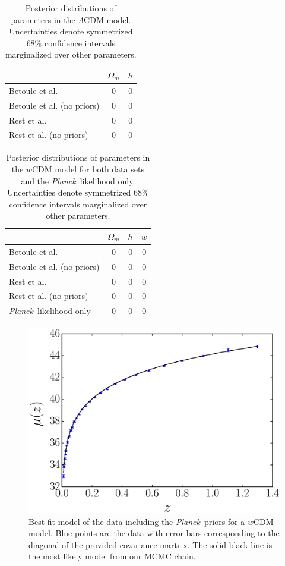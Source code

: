 \documentclass[12pt,a4paper]{article}
\newcommand\Planck{{\it Planck}\ }
\begin{document}
\begin{table}[h]
   \centering
    \begin{tabular}{l|cc}
    ~                          & $\Omega_m$ & $h$ \\ \hline
    Betoule et al.             & 0      & 0 \\
    Betoule et al. (no priors) & 0      & 0 \\
    Rest et al.                & 0      & 0 \\
    Rest et al. (no priors)    & 0      & 0 \\
    \end{tabular}
    \caption {\label{tab:lcdm}Posterior distributions of parameters in the
      $\Lambda$CDM model. Uncertainties denote symmetrized 68\%
      confidence intervals marginalized over other parameters.}
\end{table}
%
\begin{table}[h]
  \label{tab:wcdm}
  \centering
  \begin{tabular}{l|ccc}
    ~                          & $\Omega_m$ & $h$ & $w$ \\ \hline
    Betoule et al.             & 0                      & 0     & 0     \\
    Betoule et al. (no priors) & 0                      & 0     & 0     \\
    Rest et al.                & 0                      & 0     & 0     \\
    Rest et al. (no priors)    & 0                      & 0     & 0     \\
    \Planck likelihood only    & 0                      & 0     & 0     \\
  \end{tabular}
  \caption {Posterior distributions of parameters in the
    $w$CDM model for both data sets and the \Planck likelihood only. 
    Uncertainties denote symmetrized 68\%
    confidence intervals marginalized over other parameters.}
\end{table}
%
\begin{figure}
  \centering
  \includegraphics[width=0.5\linewidth]{figures/betoule_wcdm_withprior_bestfit.eps}
  \caption{Best fit model of the \citet{betoule2014} data including the
    \Planck priors for a $w$CDM model. Blue points are the data with
    error bars corresponding to the diagonal of the provided covariance martrix.
    The solid black line is the most likely model from our MCMC chain.}
  \label{fig:betoule_wcdm_prior_bestfit}
\end{figure}
\end{document}
